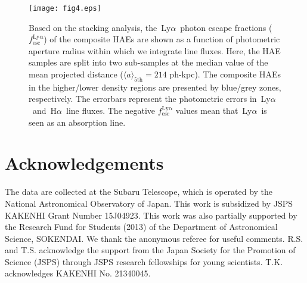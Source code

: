 \documentclass[letters,usenatbib]{mnras}
\def\lya{{\rm\,Ly$\alpha$}}
\def\ha{{\rm\,H$\alpha$}}
\begin{document}
\begin{figure}
	\centering
	\texttt{[image: fig4.eps]}
    \caption{Based on the stacking analysis, the \lya\ photon escape fractions 
    ($f_\mathrm{esc}^\mathrm{Ly\alpha}$) of the composite HAEs are shown as a 
    function of photometric aperture radius within which we integrate line fluxes. 
    Here, the HAE samples are split into two sub-samples at the median value of 
    the mean projected distance ($\langle{a}\rangle_\mathrm{5th}=214$ ph-kpc). The 
    composite HAEs in the higher/lower density regions are presented by blue/grey 
    zones, respectively. The errorbars represent the photometric errors in \lya\ 
    and \ha\ line fluxes. The negative $f_\mathrm{esc}^\mathrm{Ly\alpha}$ values 
    mean that \lya\ is seen as an absorption line.} 
    \label{fig4}
\end{figure}


\section*{Acknowledgements}

The data are collected at the Subaru Telescope, which is operated by the National 
Astronomical Observatory of Japan. This work is subsidized by JSPS KAKENHI Grant 
Number 15J04923. This work was also partially supported by the Research Fund for 
Students (2013) of the Department of Astronomical Science, SOKENDAI. We thank the 
anonymous referee for useful comments. R.S. and T.S. acknowledge the support from 
the Japan Society for the Promotion of Science (JSPS) through JSPS research 
fellowships for young scientists. T.K. acknowledges KAKENHI No. 21340045.








\bsp	%
\label{lastpage}
\end{document}
